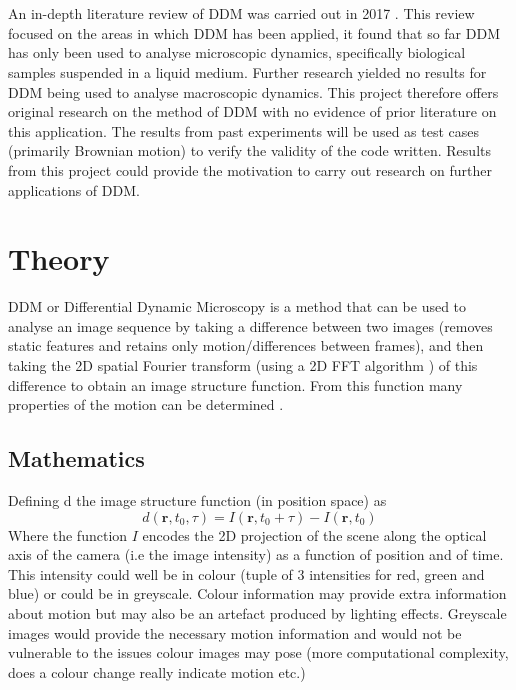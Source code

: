 \documentclass[11pt]{article}
\begin{document}
\\\\
An in-depth literature review of DDM was carried out in 2017 \cite{ddm1}. This review focused on the areas in which DDM has been applied, it found that so far DDM has only been used to analyse microscopic dynamics, specifically biological samples suspended in a liquid medium. Further research yielded no results for DDM being used to analyse macroscopic dynamics. This project therefore offers original research on the method of DDM with no evidence of prior literature on this application. The results from past experiments will be used as test cases (primarily Brownian motion) to verify the validity of the code written. Results from this project could provide the motivation to carry out research on further applications of DDM.

\clearpage
\section{Theory}

DDM or Differential Dynamic Microscopy is a method that can be used to analyse an image sequence by taking a difference between two images (removes static features and retains only motion/differences between frames), and then taking the 2D spatial Fourier transform (using a 2D FFT algorithm \cite{fft}) of this difference to obtain an image structure function.
From this function many properties of the motion can be determined \cite{ddm1}.

\subsection{Mathematics}
Defining d the image structure function (in position space) as
\begin{equation}
    d(\textbf{r}, t_0, \tau) = I(\mathbf{r}, t_0 + \tau) - I(\mathbf{r}, t_0)
\end{equation}
Where the function $\textit{I}$ encodes the 2D projection of the scene along the optical axis of the camera (i.e the image intensity) as a function of position and of time.
This intensity could well be in colour (tuple of 3 intensities for red, green and blue) or could be in greyscale. Colour information may provide extra information about motion but may also be an artefact produced by lighting effects. Greyscale images would provide the necessary motion information and would not be vulnerable to the issues colour images may pose (more computational complexity, does a colour change really indicate motion etc.)
\end{document}
